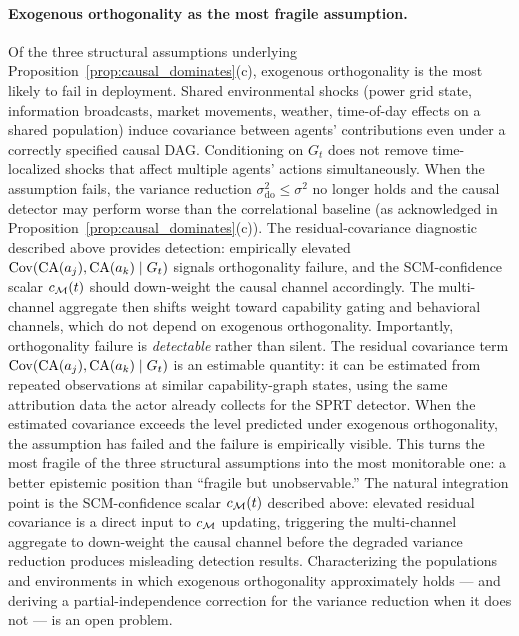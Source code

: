 \paragraph{Exogenous orthogonality as the most fragile assumption.}
Of the three structural assumptions underlying
Proposition~\ref{prop:causal_dominates}(c), exogenous orthogonality
is the most likely to fail in deployment. Shared environmental
shocks (power grid state, information broadcasts, market
movements, weather, time-of-day effects on a shared population)
induce covariance between agents' contributions even under a
correctly specified causal DAG. Conditioning on $G_t$ does not
remove time-localized shocks that affect multiple agents' actions
simultaneously. When the assumption fails, the variance reduction
$\sigma_{\mathrm{do}}^2 \leq \sigma^2$ no longer holds and the
causal detector may perform worse than the correlational baseline
(as acknowledged in Proposition~\ref{prop:causal_dominates}(c)).
The residual-covariance diagnostic described above provides
detection: empirically elevated
$\mathrm{Cov}(\mathrm{CA}(a_j), \mathrm{CA}(a_k) \mid G_t)$
signals orthogonality failure, and the SCM-confidence scalar
$c_{\mathcal{M}}(t)$ should down-weight the causal channel accordingly.
The multi-channel aggregate then shifts weight toward capability
gating and behavioral channels, which do not depend on exogenous
orthogonality. Importantly, orthogonality failure is \emph{detectable} rather
than silent. The residual covariance term
$\mathrm{Cov}(\mathrm{CA}(a_j), \mathrm{CA}(a_k) \mid G_t)$ is an
estimable quantity: it can be estimated from repeated observations
at similar capability-graph states, using the same attribution data
the actor already collects for the SPRT detector. When the estimated covariance exceeds the level predicted
under exogenous orthogonality, the assumption has failed and the
failure is empirically visible. This turns the most fragile of the
three structural assumptions into the most monitorable one:
a better epistemic position than ``fragile but unobservable.'' The
natural integration point is the SCM-confidence scalar
$c_{\mathcal{M}}(t)$ described above: elevated residual covariance is a
direct input to $c_{\mathcal{M}}$ updating, triggering the multi-channel
aggregate to down-weight the causal channel before the degraded
variance reduction produces misleading detection results.
Characterizing the populations and environments in
which exogenous orthogonality approximately holds --- and deriving
a partial-independence correction for the variance reduction when
it does not --- is an open problem.

